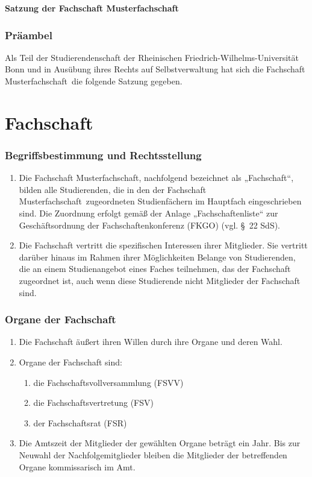 \documentclass{article}
\newcommand{\fachschaft}{Musterfachschaft}
\begin{document}
\noindent
\begin{center}
    \huge \textbf{Satzung der Fachschaft \linebreak[1] \fachschaft} \\
    \large {}
\end{center}

\section*{Präambel}
\noindent
Als Teil der Studierendenschaft der Rheinischen Friedrich-Wilhelms-Universität Bonn und in Ausübung ihres Rechts auf Selbstverwaltung hat sich die Fachschaft \fachschaft\ die
folgende Satzung gegeben.
 

\part{Fachschaft}
\section{Begriffsbestimmung und Rechtsstellung}
\begin{enumerate}[(1)]
\item Die Fachschaft \fachschaft , nachfolgend bezeichnet als „Fachschaft“, bilden alle Studierenden, die in den der Fachschaft \fachschaft\ zugeordneten Studienfächern im Hauptfach eingeschrieben sind. Die Zuordnung erfolgt gemäß der Anlage „Fachschaftenliste“ zur Geschäftsordnung der Fachschaftenkonferenz (FKGO) (vgl. §~22 SdS).
\item Die Fachschaft vertritt die spezifischen Interessen ihrer Mitglieder. Sie vertritt darüber hinaus im Rahmen ihrer Möglichkeiten Belange von Studierenden, die an einem Studienangebot eines Faches teilnehmen, das der Fachschaft zugeordnet ist, auch wenn diese Studierende nicht Mitglieder der Fachschaft sind.
\end{enumerate}

\section{Organe der Fachschaft}
\begin{enumerate}[(1)]
\item Die Fachschaft äußert ihren Willen durch ihre Organe und deren Wahl.
\item Organe der Fachschaft sind:
\begin{enumerate}[1.]
    \item die Fachschaftsvollversammlung (FSVV)
    \item die Fachschaftsvertretung (FSV)
    \item der Fachschaftsrat (FSR)
\end{enumerate}
\item Die Amtszeit der Mitglieder der gewählten Organe beträgt ein Jahr. Bis zur Neuwahl der Nachfolgemitglieder bleiben die Mitglieder der betreffenden Organe kommissarisch im Amt.
\end{enumerate}
\end{document}
